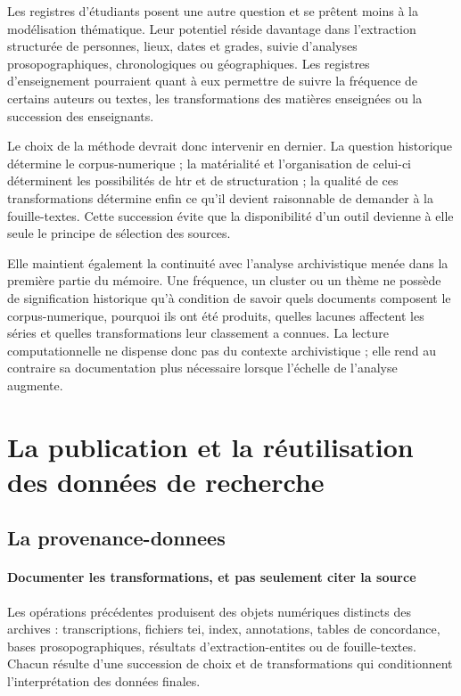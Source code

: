 Les registres d'étudiants posent une autre question et se prêtent moins à la modélisation thématique. Leur potentiel réside davantage dans l'extraction structurée de personnes, lieux, dates et grades, suivie d'analyses prosopographiques, chronologiques ou géographiques. Les registres d'enseignement pourraient quant à eux permettre de suivre la fréquence de certains auteurs ou textes, les transformations des matières enseignées ou la succession des enseignants.

Le choix de la méthode devrait donc intervenir en dernier. La question historique détermine le \gls{corpus-numerique} ; la matérialité et l'organisation de celui-ci déterminent les possibilités de \gls{htr} et de structuration ; la qualité de ces transformations détermine enfin ce qu'il devient raisonnable de demander à la \gls{fouille-textes}. Cette succession évite que la disponibilité d'un outil devienne à elle seule le principe de sélection des sources.

Elle maintient également la continuité avec l'analyse archivistique menée dans la première partie du mémoire. Une fréquence, un cluster ou un thème ne possède de signification historique qu'à condition de savoir quels documents composent le \gls{corpus-numerique}, pourquoi ils ont été produits, quelles lacunes affectent les séries et quelles transformations leur classement a connues. La lecture computationnelle ne dispense donc pas du contexte archivistique ; elle rend au contraire sa documentation plus nécessaire lorsque l'échelle de l'analyse augmente.



\section{La publication et la réutilisation des données de recherche}

\subsection{La \gls{provenance-donnees}}

\paragraph{Documenter les transformations, et pas seulement citer la source}

Les opérations précédentes produisent des objets numériques distincts des archives : transcriptions, fichiers \gls{tei}, index, annotations, tables de concordance, bases prosopographiques, résultats d'\gls{extraction-entites} ou de \gls{fouille-textes}. Chacun résulte d'une succession de choix et de transformations qui conditionnent l'interprétation des données finales.

